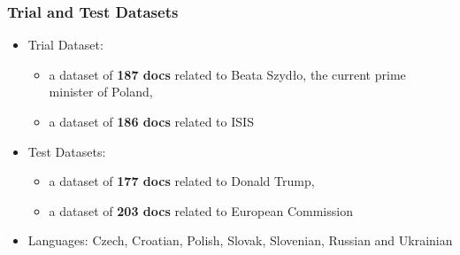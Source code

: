 \documentclass{beamer}
\begin{document}
\begin{frame}[fragile]
 \frametitle{Trial and Test Datasets}

\begin{itemize}

\item Trial Dataset: 

\begin{itemize}

\item a dataset of \textbf{187 docs} related to {\color{red}Beata Szydło}, the
current prime minister of Poland, 

\item a dataset of \textbf{186 docs} related to {\color{red}ISIS}

\end{itemize}

\item Test Datasets:

\begin{itemize}

\item a dataset of \textbf{177 docs} related to {\color{red}Donald Trump}, 

\item a dataset of \textbf{203 docs} related to {\color{red}European Commission}

\end{itemize}

\item Languages: Czech, Croatian, Polish, Slovak, Slovenian, Russian and Ukrainian

\end{itemize}

\end{frame}
\end{document}
